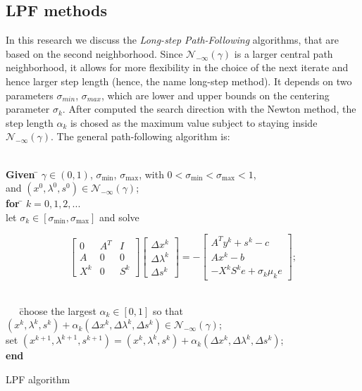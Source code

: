 \documentclass[a4paper,10 pt,titlepage,twoside]{book}
\theoremstyle{plain}
\theoremstyle{definition}
\theoremstyle{remark}
\begin{document}
\subsection*{LPF methods}
In this research we discuss the \textit{Long-step Path-Following} algorithms, that are based on the second neighborhood. Since  $\mathcal{N}_{-\infty}(\gamma)$ is a larger central path neighborhood, it allows for more flexibility in the choice of the next iterate and hence larger step length (hence, the name long-step method). It depends on two parameters $\sigma_{min}$, $\sigma_{max}$, which are lower and upper bounds on the centering parameter $\sigma_{k}$. After computed the search direction with the Newton method, the step length $\alpha_{k}$ is chosed as the maximum value subject to staying inside $\mathcal{N}_{-\infty}(\gamma)$.
The general path-following algorithm is:
\begin{algorithm}[H]
	\begin{tabbing}
		\\
		\textbf{Given  }\= $\gamma\in(0,1)$, $\sigma_{\text{min}}$, $\sigma_{\text{max}}$, with $0<\sigma_{\text{min}}< \sigma_{\text{max}}<1$,\\
		\> and $(x^{0}, \lambda^{0}, s^{0})\in\mathcal{N}_{-\infty}(\gamma)$;\\
		\textbf{for} \= $k = 0, 1, 2,...$ \\
		\> let $\sigma_{k}\in[\sigma_{\text{min}},\sigma_{\text{max}}]$ and solve
	\end{tabbing}
	\begin{equation}\label{Pb}
	\begin{bmatrix}
	0&A^{T}&I \\A&0&0\\X^{k}&0&S^{k}
	\end{bmatrix}\begin{bmatrix}
	\Delta x^{k}\\\Delta\lambda^{k} \\\Delta s^{k}
	\end{bmatrix}=-\begin{bmatrix}
	A^{T}y^{k}+s^{k}-c\\Ax^{k}-b\\-X^{k}S^{k}e + \sigma_{k}\mu_{k}e
	\end{bmatrix};
	\end{equation}
	\begin{tabbing}
		\\
		$\;\;\;\;\;$\=choose the largest $\alpha_{k}\in[0,1]$ so that $(x^{k}, \lambda^{k}, s^{k})+ \alpha_{k}(\Delta x^{k}, \Delta\lambda^{k}, \Delta s^{k})\in\mathcal{N}_{-\infty}(\gamma)$; \\
		\>set $(x^{k+1}, \lambda^{k+1}, s^{k+1}) = (x^{k}, \lambda^{k}, s^{k})+ \alpha_{k}(\Delta x^{k}, \Delta\lambda^{k}, \Delta s^{k})$;\\
		
		\textbf{end}
	\end{tabbing}
	\caption{LPF algorithm}
\end{algorithm}
\end{document}
